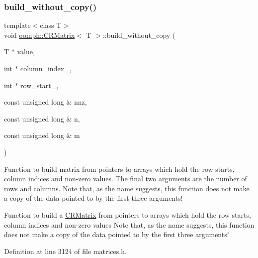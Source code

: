 \mbox{\label{classoomph_1_1CRMatrix_aee41b01876f3b8ce9011e6fe7a332da6}} 
\subsubsection{\texorpdfstring{build\+\_\+without\+\_\+copy()}{build\_without\_copy()}}
{\footnotesize\ttfamily template$<$class T$>$ \\
void \hyperlink{classoomph_1_1CRMatrix}{oomph\+::\+C\+R\+Matrix}$<$ T $>$\+::build\+\_\+without\+\_\+copy (\begin{DoxyParamCaption}\item[{T $\ast$}]{value,  }\item[{int $\ast$}]{column\+\_\+index\+\_\+,  }\item[{int $\ast$}]{row\+\_\+start\+\_\+,  }\item[{const unsigned long \&}]{nnz,  }\item[{const unsigned long \&}]{n,  }\item[{const unsigned long \&}]{m }\end{DoxyParamCaption})}



Function to build matrix from pointers to arrays which hold the row starts, column indices and non-\/zero values. The final two arguments are the number of rows and columns. Note that, as the name suggests, this function does not make a copy of the data pointed to by the first three arguments! 

Function to build a \hyperlink{classoomph_1_1CRMatrix}{C\+R\+Matrix} from pointers to arrays which hold the row starts, column indices and non-\/zero values Note that, as the name suggests, this function does not make a copy of the data pointed to by the first three arguments! 

Definition at line 3124 of file matrices.\+h.

\mbox{\label{classoomph_1_1CRMatrix_a14f6cf02e78e14afc9a50eb73c6d517a}} 
